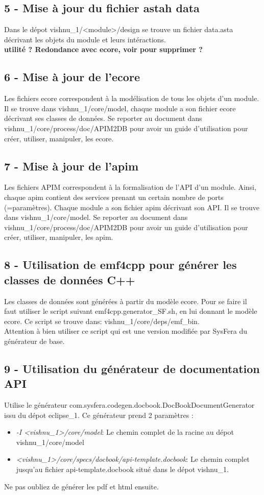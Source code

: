 \documentclass{article}
\begin{document}
\subsection{5 - Mise à jour du fichier astah data}
Dans le dépot vishnu\_1/<module>/design se trouve un fichier data.asta décrivant les objets du module
et leurs intéractions. \\
\textbf{utilité ? Redondance avec ecore, voir pour supprimer ?}

\subsection{6 - Mise à jour de l'ecore }
Les fichiers ecore correspondent à la modélisation de tous les objets d'un module. Il se trouve dans
vishnu\_1/core/model, chaque module a son fichier ecore décrivant ses classes de données.
Se reporter au document dans \\
 vishnu\_1/core/process/doc/APIM2DB pour avoir un guide d'utilisation
pour créer, utiliser, manipuler, les ecore.

\subsection{7 - Mise à jour de l'apim }
Les fichiers APIM correspondent à la formalisation de l'API d'un module. Ainsi, chaque apim
contient des services prenant un certain nombre de ports (=paramètres). Chaque module a
son fichier apim décrivant son API. Il se trouve dans vishnu\_1/core/model. 
Se reporter au document dans vishnu\_1/core/process/doc/APIM2DB pour avoir un guide d'utilisation
pour créer, utiliser, manipuler, les apim.

\subsection{8 - Utilisation de emf4cpp pour générer les classes de données C++ }
Les classes de données sont générées à partir du modèle ecore. Pour se faire il 
faut utiliser le script suivant emf4cpp.generator\_SF.sh, en lui donnant le
modèle ecore. Ce script se trouve dans:
vishnu\_1/core/deps/emf\_bin. \\
Attention à bien utiliser ce script qui est une version modifiée par SysFera 
du générateur de base.

\subsection{9 - Utilisation du générateur de documentation API}
Utilise le générateur com.sysfera.codegen.docbook.DocBookDocumentGenerator
issu du dépot eclipse\_1. Ce générateur prend 2 paramètres :
\begin{itemize}
\item \textit{-I <vishnu\_1>/core/model}: Le chemin complet de la racine au dépot 
vishnu\_1/core/model
\item \textit{<vishnu\_1>/core/specs/docbook/api-template.docbook}: Le chemin
complet jusqu'au fichier api-template.docbook situé dans le dépot vishnu\_1.
\end{itemize}
Ne pas oubliez de générer les pdf et html ensuite.
\end{document}
